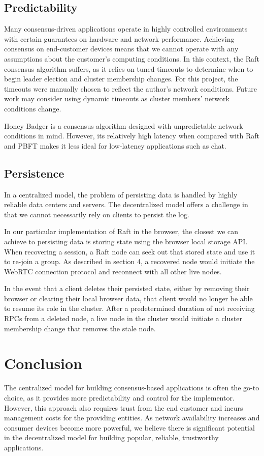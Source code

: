\documentclass[11pt,twocolumn]{article}
\begin{document}
\subsection{Predictability}
Many consensus-driven applications operate in highly controlled environments with certain guarantees on hardware and network performance. Achieving consensus on end-customer devices means that we cannot operate with any assumptions about the customer's computing conditions. In this context, the Raft consensus algorithm suffers, as it relies on tuned timeouts to determine when to begin leader election and cluster membership changes. For this project, the timeouts were manually chosen to reflect the author's network conditions. Future work may consider using dynamic timeouts as cluster members' network conditions change.

Honey Badger \cite{honeybadgerpaper} is a consensus algorithm designed with unpredictable network conditions in mind. However, its relatively high latency when compared with Raft and PBFT makes it less ideal for low-latency applications such as chat.

\subsection{Persistence}
In a centralized model, the problem of persisting data is handled by highly reliable data centers and servers. The decentralized model offers a challenge in that we cannot necessarily rely on clients to persist the log.

In our particular implementation of Raft in the browser, the closest we can achieve to persisting data is storing state using the browser local storage API. When recovering a session, a Raft node can seek out that stored state and use it to re-join a group. As described in section 4, a recovered node would initiate the WebRTC connection protocol and reconnect with all other live nodes.

In the event that a client deletes their persisted state, either by removing their browser or clearing their local browser data, that client would no longer be able to resume its role in the cluster. After a predetermined duration of not receiving RPCs from a deleted node, a live node in the cluster would initiate a cluster membership change that removes the stale node.


\section{Conclusion}
The centralized model for building consensus-based applications is often the go-to choice, as it provides more predictability and control for the implementor. However, this approach also requires trust from the end customer and incurs management costs for the providing entities. As network availability increases and consumer devices become more powerful, we believe there is significant potential in the decentralized model for building popular, reliable, trustworthy applications.
\end{document}
